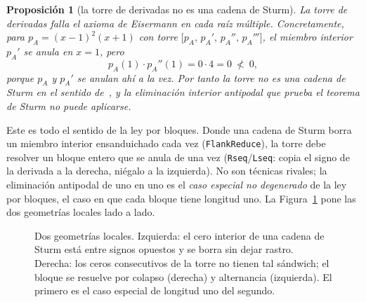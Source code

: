 \documentclass[11pt]{article}
\newtheorem{proposition}{Proposici\'on}
\newcommand{\lean}[1]{{\def\_{\textunderscore\allowbreak}\texttt{#1}}}
\begin{document}
\begin{proposition}[la torre de derivadas no es una cadena de Sturm]\label{prop:notsturm}
La torre de derivadas falla el axioma de Eisermann en cada ra\'iz m\'ultiple. Concretamente, para
$p_A=(x-1)^2(x+1)$ con torre $\big[p_A,\,p_A',\,p_A'',\,p_A'''\big]$, el miembro interior $p_A'$ se anula en
$x=1$, pero
\[
  p_A(1)\cdot p_A''(1)=0\cdot4=0\ \not<\ 0,
\]
porque $p_A$ y $p_A'$ se anulan ah\'i \emph{a la vez}. Por tanto la torre no es una cadena de Sturm en el
sentido de~\cite{eisermann}, y la eliminaci\'on interior antipodal que prueba el teorema de Sturm no puede
aplicarse.
\end{proposition}

Este es todo el sentido de la ley por bloques. Donde una cadena de Sturm borra un miembro interior
ensanduichado cada vez (\lean{FlankReduce}), la torre debe resolver un bloque entero que se anula de una vez
(\lean{Rseq}/\lean{Lseq}: copia el signo de la derivada a la derecha, ni\'egalo a la izquierda). No son
t\'ecnicas rivales; la eliminaci\'on antipodal de uno en uno es el \emph{caso especial no degenerado} de la
ley por bloques, el caso en que cada bloque tiene longitud uno. La Figura~\ref{fig:divide} pone las dos
geometr\'ias locales lado a lado.

\begin{figure}[htbp]
\centering
{}
\caption{Dos geometr\'ias locales. Izquierda: el cero interior de una cadena de Sturm est\'a entre signos
opuestos y se borra sin dejar rastro. Derecha: los ceros consecutivos de la torre no tienen tal s\'andwich;
el bloque se resuelve por colapso (derecha) y alternancia (izquierda). El primero es el caso especial de
longitud uno del segundo.}
\label{fig:divide}
\end{figure}
\end{document}
